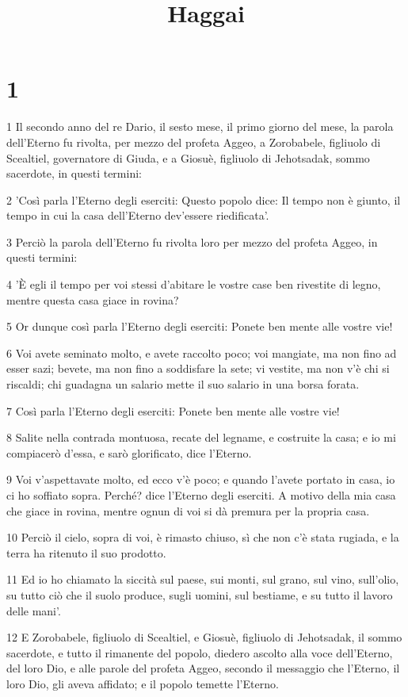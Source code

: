 

\title{Haggai}


\chapter{1}

\par 1 Il secondo anno del re Dario, il sesto mese, il primo giorno del mese, la parola dell'Eterno fu rivolta, per mezzo del profeta Aggeo, a Zorobabele, figliuolo di Scealtiel, governatore di Giuda, e a Giosuè, figliuolo di Jehotsadak, sommo sacerdote, in questi termini:
\par 2 'Così parla l'Eterno degli eserciti: Questo popolo dice: Il tempo non è giunto, il tempo in cui la casa dell'Eterno dev'essere riedificata'.
\par 3 Perciò la parola dell'Eterno fu rivolta loro per mezzo del profeta Aggeo, in questi termini:
\par 4 'È egli il tempo per voi stessi d'abitare le vostre case ben rivestite di legno, mentre questa casa giace in rovina?
\par 5 Or dunque così parla l'Eterno degli eserciti: Ponete ben mente alle vostre vie!
\par 6 Voi avete seminato molto, e avete raccolto poco; voi mangiate, ma non fino ad esser sazi; bevete, ma non fino a soddisfare la sete; vi vestite, ma non v'è chi si riscaldi; chi guadagna un salario mette il suo salario in una borsa forata.
\par 7 Così parla l'Eterno degli eserciti: Ponete ben mente alle vostre vie!
\par 8 Salite nella contrada montuosa, recate del legname, e costruite la casa; e io mi compiacerò d'essa, e sarò glorificato, dice l'Eterno.
\par 9 Voi v'aspettavate molto, ed ecco v'è poco; e quando l'avete portato in casa, io ci ho soffiato sopra. Perché? dice l'Eterno degli eserciti. A motivo della mia casa che giace in rovina, mentre ognun di voi si dà premura per la propria casa.
\par 10 Perciò il cielo, sopra di voi, è rimasto chiuso, sì che non c'è stata rugiada, e la terra ha ritenuto il suo prodotto.
\par 11 Ed io ho chiamato la siccità sul paese, sui monti, sul grano, sul vino, sull'olio, su tutto ciò che il suolo produce, sugli uomini, sul bestiame, e su tutto il lavoro delle mani'.
\par 12 E Zorobabele, figliuolo di Scealtiel, e Giosuè, figliuolo di Jehotsadak, il sommo sacerdote, e tutto il rimanente del popolo, diedero ascolto alla voce dell'Eterno, del loro Dio, e alle parole del profeta Aggeo, secondo il messaggio che l'Eterno, il loro Dio, gli aveva affidato; e il popolo temette l'Eterno.
